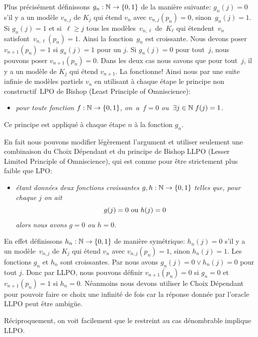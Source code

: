 Plus précisément définissons $g_{n}:\mathbb{N}\rightarrow \{0,1\}$ de la manière suivante: $g_{n}(j)=0$ s'il y a un modèle
$v_{n,j}$ de $K_{j}$ qui étend  $v_{n}$ avec $v_{n,j}(p_{n})=0$,
sinon~\hbox{$g_{n}(j)=1$}. Si $g_{n}(j)=1$ et \hbox{si $\ell\geq j$}
tous les modèles~$v_{n,\ell}$
de~$K_{\ell}$ qui étendent~$v_{n}$ satisfont~\hbox{$v_{n,\ell}(p_{n})=1$}.
Ainsi la fonction~$g_n$ est croissante.
Nous devons poser $v_{n+1}(p_n)=1$ si $g_{n}(j)=1$ pour un $j$.
Si $g_{n}(j)=0$ pour tout~$j$, nous pouvons poser $v_{n+1}(p_n)=0$.
Dans les deux cas nous savons que pour tout~$j$, il y a un modèle de $K_j$
qui étend $v_{n+1}$. La \recu fonctionne! 
 Ainsi nous  par \recu une suite infinie de modèles partiels $v_n$ en utilisant à chaque étape le principe non constructif~LPO de Bishop (Least Principle of Omniscience):
\begin{itemize}
%
\item  [$\bullet$] \emph{pour toute fonction $f:\mathbb{N}\rightarrow \{0,1\}$,
\hbox{on a $f=0$} \hbox{ou $\exists j\in\mathbb{N}\;f(j)= 1$}.}
\end{itemize}
Ce principe est appliqué
à chaque étape $n$ à la fonction $g_n$. 

En fait nous pouvons modifier 
légèrement l'argument et utiliser seulement une combinaison du Choix Dépendant et du principe de Bishop LLPO (Lesser Limited
Principle of Omniscience), qui est connue pour être strictement plus faible que LPO: 
\begin{itemize}
%
\item  [$\bullet$] \emph{étant données deux fonctions croissantes
$g,h:\mathbb{N}\rightarrow \{0,1\}$ telles que, pour chaque $j$ on ait
$$g(j) = 0 \hbox{ ou } h(j) = 0$$
alors nous avons $g=0$ ou $h=0$.} 
\end{itemize}
En effet définissons
$h_{n}:\mathbb{N}\rightarrow \{0,1\}$ de manière symétrique:
 $h_{n}(j)=0$ s'il y a un modèle~$v_{n,j}$ de $K_{j}$ qui étend  $v_{n}$ avec $v_{n,j}(p_{n})=1$,
sinon $h_{n}(j)=1$. Les fonctions $g_n$ et $h_n$ sont croissantes. Par \hdr nous avons
$g_n(j) = 0 \vee h_n(j) = 0$ pour tout $j$. Donc par LLPO, nous pouvons définir $v_{n+1}(p_n)=0$
si $g_n=0$ et $v_{n+1}(p_n)=1$ si $h_n=0$.
Néanmoins nous devons utiliser le Choix Dépendant pour pouvoir faire
ce choix une infinité de fois car la réponse
 donnée par l'oracle LLPO peut être ambigüe.


Réciproquement, on voit facilement que le \tcg restreint au cas dénombrable implique LLPO.


